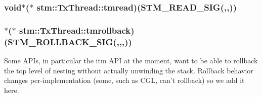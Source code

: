 \hypertarget{structstm_1_1TxThread_ae294456a4d6150a2e14ccedaaf9cf0bb}{
\subsubsection[{tmread}]{ void$\ast$($\ast$ stm\-::\-Tx\-Thread\-::tmread)({\bf S\-T\-M\-\_\-\-R\-E\-A\-D\-\_\-\-S\-I\-G}(,,))}}\label{structstm_1_1TxThread_ae294456a4d6150a2e14ccedaaf9cf0bb}
\hypertarget{structstm_1_1TxThread_a81a345efa23f5511ed79cb41e03445b6}{
\subsubsection[{tmrollback}]{ $\ast$($\ast$ stm\-::\-Tx\-Thread\-::tmrollback)({\bf S\-T\-M\-\_\-\-R\-O\-L\-L\-B\-A\-C\-K\-\_\-\-S\-I\-G}(,,,))\hspace{0.3cm}{\ttfamily [static]}}}\label{structstm_1_1TxThread_a81a345efa23f5511ed79cb41e03445b6}
Some A\-P\-Is, in particular the itm A\-P\-I at the moment, want to be able to rollback the top level of nesting without actually unwinding the stack. Rollback behavior changes per-\/implementation (some, such as C\-G\-L, can't rollback) so we add it here.

